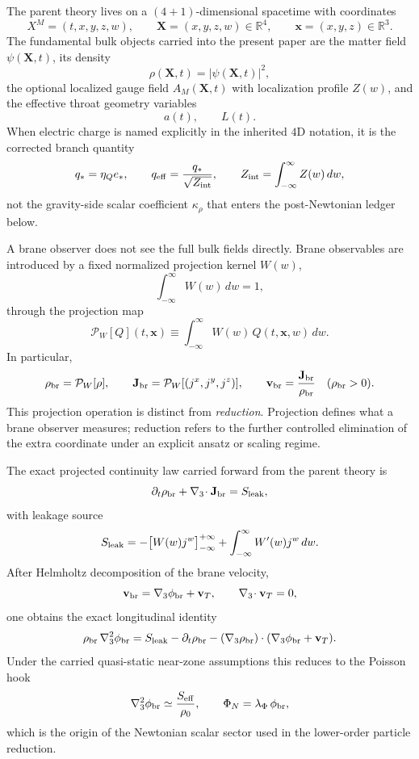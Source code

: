 \documentclass[11pt]{article}
\begin{document}
The parent theory lives on a $(4+1)$-dimensional spacetime with coordinates
\[
X^M=(t,x,y,z,w),
\qquad
\mathbf{X}=(x,y,z,w)\in\mathbb R^4,
\qquad
\mathbf{x}=(x,y,z)\in\mathbb R^3.
\]
The fundamental bulk objects carried into the present paper are the matter field
$\psi(\mathbf{X},t)$, its density
\[
\rho(\mathbf{X},t)=|\psi(\mathbf{X},t)|^2,
\]
the optional localized gauge field $A_M(\mathbf{X},t)$ with localization profile
$Z(w)$, and the effective throat geometry variables
\[
a(t),\qquad L(t).
\]
When electric charge is named explicitly in the inherited $4$D notation, it is the
corrected branch quantity
\[
q_* = \eta_Q e_*,
\qquad
q_{\rm eff}=\frac{q_*}{\sqrt{Z_{\rm int}}},
\qquad
Z_{\rm int}=\int_{-\infty}^{\infty} Z(w)\,dw,
\]
not the gravity-side scalar coefficient $\kappa_\rho$ that enters the post-Newtonian
ledger below.

A brane observer does not see the full bulk fields directly.  Brane observables are
introduced by a fixed normalized projection kernel $W(w)$,
\[
\int_{-\infty}^{\infty} W(w)\,dw = 1,
\]
through the projection map
\[
\mathcal P_W[Q](t,\mathbf{x})
\equiv
\int_{-\infty}^{\infty} W(w)\,Q(t,\mathbf{x},w)\,dw.
\]
In particular,
\[
\rho_{\rm br}=\mathcal P_W[\rho],
\qquad
\mathbf J_{\rm br}=\mathcal P_W[(j^x,j^y,j^z)],
\qquad
\mathbf v_{\rm br}=\frac{\mathbf J_{\rm br}}{\rho_{\rm br}}
\quad (\rho_{\rm br}>0).
\]
This projection operation is distinct from \emph{reduction}.  Projection defines what a
brane observer measures; reduction refers to the further controlled elimination of the
extra coordinate under an explicit ansatz or scaling regime.

The exact projected continuity law carried forward from the parent theory is
\[
\partial_t\rho_{\rm br}+\nabla_3\!\cdot\mathbf J_{\rm br}=S_{\rm leak},
\]
with leakage source
\[
S_{\rm leak}
=
-\bigl[W(w)j^w\bigr]_{-\infty}^{+\infty}
+
\int_{-\infty}^{\infty} W'(w)j^w\,dw.
\]
After Helmholtz decomposition of the brane velocity,
\[
\mathbf v_{\rm br}=\nabla_3\phi_{\rm br}+\mathbf v_T,
\qquad
\nabla_3\!\cdot\mathbf v_T=0,
\]
one obtains the exact longitudinal identity
\[
\rho_{\rm br}\,\nabla_3^2\phi_{\rm br}
=
S_{\rm leak}
-\partial_t\rho_{\rm br}
-(\nabla_3\rho_{\rm br})\cdot(\nabla_3\phi_{\rm br}+\mathbf v_T).
\]
Under the carried quasi-static near-zone assumptions this reduces to the Poisson hook
\[
\nabla_3^2\phi_{\rm br}\simeq \frac{S_{\rm eff}}{\rho_0},
\qquad
\Phi_N=\lambda_\Phi\,\phi_{\rm br},
\]
which is the origin of the Newtonian scalar sector used in the lower-order particle
reduction.
\end{document}
